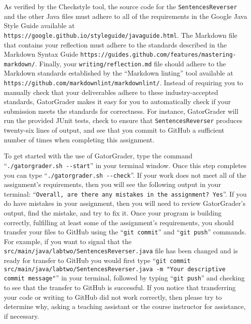 \documentclass[11pt]{article}
\newcommand{\mainprogram}{\lstinline{SentencesReverser}}
\newcommand{\mainprogramsource}{\lstinline{src/main/java/labtwo/SentencesReverser.java}}
\newcommand{\reflection}{\lstinline{writing/reflection.md}}
\newcommand{\gatorgraderstart}{\command{./gatorgrader.sh --start}}
\newcommand{\gatorgradercheck}{\command{./gatorgrader.sh --check}}
\newcommand{\gitcommit}{\command{git commit}}
\newcommand{\gitpush}{\command{git push}}
\newcommand{\gitcommitmainprogram}{\command{git commit src/main/java/labtwo/SentencesReverser.java -m "Your
descriptive commit message"}}
\newcommand{\command}[1]{``\lstinline{#1}''}
\newcommand{\url}[1]{\lstinline{#1}}
\newcommand{\step}[1]{``{#1}''}
\begin{document}
As verified by the Checkstyle tool, the source code for the \mainprogram{} and the
other Java files must adhere to all of the requirements in the Google Java Style
Guide available at \url{https://google.github.io/styleguide/javaguide.html}. The
Markdown file that contains your reflection must adhere to the standards
described in the Markdown Syntax Guide
\url{https://guides.github.com/features/mastering-markdown/}. Finally, your
\reflection{} file should adhere to the Markdown standards established by the
\step{Markdown linting} tool available at
\url{https://github.com/markdownlint/markdownlint/}. Instead of requiring you to
manually check that your deliverables adhere to these industry-accepted
standards, GatorGrader makes it easy for you to automatically check if your
submission meets the standards for correctness. For instance, GatorGrader will
run the provided JUnit tests, check to ensure that \mainprogram{} produces
twenty-six lines of output, and see that you commit to GitHub a sufficient
number of times when completing this assignment.

To get started with the use of GatorGrader, type the command \gatorgraderstart{} in your terminal window. Once this step
completes you can type \gatorgradercheck{}. If your work does not meet all of the assignment's requirements, then you
will see the following output in your terminal: \command{Overall, are there any mistakes in the assignment? Yes}. If you
do have mistakes in your assignment, then you will need to review GatorGrader's output, find the mistake, and try to fix
it. Once your program is building correctly, fulfilling at least some of the assignment's requirements, you should
transfer your files to GitHub using the \gitcommit{} and \gitpush{} commands. For example, if you want to signal that
the \mainprogramsource{} file has been changed and is ready for transfer to GitHub you would first type
\gitcommitmainprogram{} in your terminal, followed by typing \gitpush{} and checking to see that the transfer to GitHub
is successful. If you notice that transferring your code or writing to GitHub did not work correctly, then please try to
determine why, asking a teaching assistant or the course instructor for assistance, if necessary.
\end{document}
